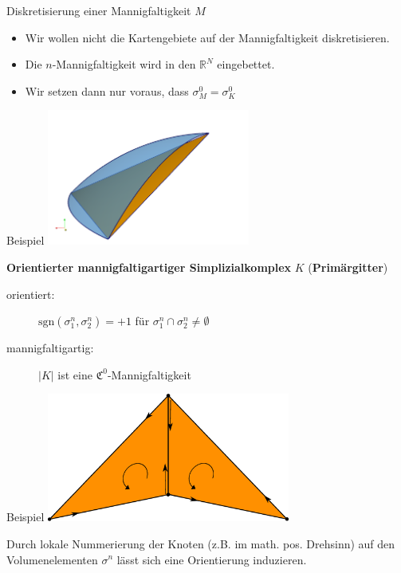\documentclass[handout]{beamer}
\newcommand{\R}{\mathds{R}}
\newcommand{\sgn}{\text{sgn}}
\begin{document}
  \begin{frame}
    \begin{block}{Diskretisierung einer Mannigfaltigkeit \( M \)}
      \begin{itemize}
        \item Wir wollen nicht die Kartengebiete auf der Mannigfaltigkeit diskretisieren.
        \item Die \( n \)-Mannigfaltigkeit wird in den \( \R^{N} \) eingebettet.
        \item Wir setzen dann nur voraus, dass \( \sigma^{0}_{M} = \sigma^{0}_{K} \)
      \end{itemize}
    \end{block}
    \begin{block}{Beispiel}
      \centering\includegraphics[width=0.5\textwidth]{bilder/paraview/abstractSimplex.png}
    \end{block}
  \end{frame}

  \begin{frame}
    \begin{block}{\textbf{Orientierter mannigfaltigartiger Simplizialkomplex} \( K \) (\textbf{Primärgitter})}
      \begin{description}
        \item[orientiert:] \( \sgn(\sigma^{n}_{1}, \sigma^{n}_{2}) = +1 \) für \( \sigma^{n}_{1} \cap \sigma^{n}_{2} \ne \emptyset \)
        \item[mannigfaltigartig:] \( |K| \) ist eine \( \mathfrak{C}^{0} \)-Mannigfaltigkeit
      \end{description}
    \end{block}
    \begin{block}{Beispiel}
      \centering\includegraphics[width=0.6\textwidth]{bilder/inkscape/2Dreiecke.eps}
    \end{block}
    Durch lokale Nummerierung der Knoten (z.B. im math. pos. Drehsinn) auf den Volumenelementen \( \sigma^{n} \) lässt sich eine Orientierung induzieren.
  \end{frame}
\end{document}
